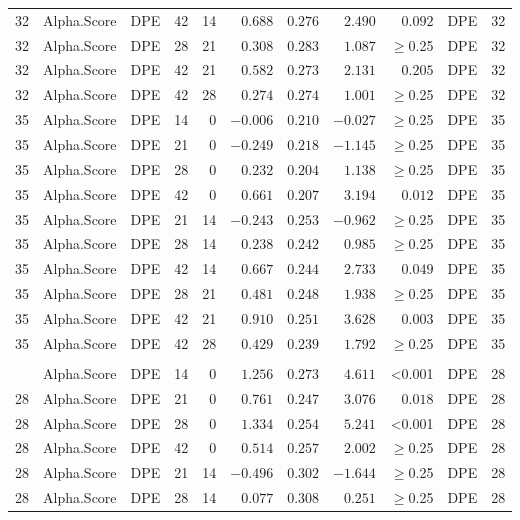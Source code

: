\documentclass[
]{article}
\begin{document}
\begin{longtable}{cllrrrrrrlc}
32 & Alpha.Score & DPE & 42 & 14 & $0.688$ & $0.276$ & $2.490$ & $0.092$ & DPE & 32 \\ 
32 & Alpha.Score & DPE & 28 & 21 & $0.308$ & $0.283$ & $1.087$ & $\geq$0.25 & DPE & 32 \\ 
32 & Alpha.Score & DPE & 42 & 21 & $0.582$ & $0.273$ & $2.131$ & $0.205$ & DPE & 32 \\ 
32 & Alpha.Score & DPE & 42 & 28 & $0.274$ & $0.274$ & $1.001$ & $\geq$0.25 & DPE & 32 \\ 
35 & Alpha.Score & DPE & 14 & 0 & $-0.006$ & $0.210$ & $-0.027$ & $\geq$0.25 & DPE & 35 \\ 
35 & Alpha.Score & DPE & 21 & 0 & $-0.249$ & $0.218$ & $-1.145$ & $\geq$0.25 & DPE & 35 \\ 
35 & Alpha.Score & DPE & 28 & 0 & $0.232$ & $0.204$ & $1.138$ & $\geq$0.25 & DPE & 35 \\ 
35 & Alpha.Score & DPE & 42 & 0 & $0.661$ & $0.207$ & $3.194$ & $0.012$ & DPE & 35 \\ 
35 & Alpha.Score & DPE & 21 & 14 & $-0.243$ & $0.253$ & $-0.962$ & $\geq$0.25 & DPE & 35 \\ 
35 & Alpha.Score & DPE & 28 & 14 & $0.238$ & $0.242$ & $0.985$ & $\geq$0.25 & DPE & 35 \\ 
35 & Alpha.Score & DPE & 42 & 14 & $0.667$ & $0.244$ & $2.733$ & $0.049$ & DPE & 35 \\ 
35 & Alpha.Score & DPE & 28 & 21 & $0.481$ & $0.248$ & $1.938$ & $\geq$0.25 & DPE & 35 \\ 
35 & Alpha.Score & DPE & 42 & 21 & $0.910$ & $0.251$ & $3.628$ & $0.003$ & DPE & 35 \\ 
35 & Alpha.Score & DPE & 42 & 28 & $0.429$ & $0.239$ & $1.792$ & $\geq$0.25 & DPE & 35 \\ 
\midrule\addlinespace[2.5pt]
\multicolumn{11}{l}{Simpson} \\ 
\midrule\addlinespace[2.5pt]
28 & Alpha.Score & DPE & 14 & 0 & $1.256$ & $0.273$ & $4.611$ & <0.001 & DPE & 28 \\ 
28 & Alpha.Score & DPE & 21 & 0 & $0.761$ & $0.247$ & $3.076$ & $0.018$ & DPE & 28 \\ 
28 & Alpha.Score & DPE & 28 & 0 & $1.334$ & $0.254$ & $5.241$ & <0.001 & DPE & 28 \\ 
28 & Alpha.Score & DPE & 42 & 0 & $0.514$ & $0.257$ & $2.002$ & $\geq$0.25 & DPE & 28 \\ 
28 & Alpha.Score & DPE & 21 & 14 & $-0.496$ & $0.302$ & $-1.644$ & $\geq$0.25 & DPE & 28 \\ 
28 & Alpha.Score & DPE & 28 & 14 & $0.077$ & $0.308$ & $0.251$ & $\geq$0.25 & DPE & 28 \\ 

\end{longtable}
\end{document}
